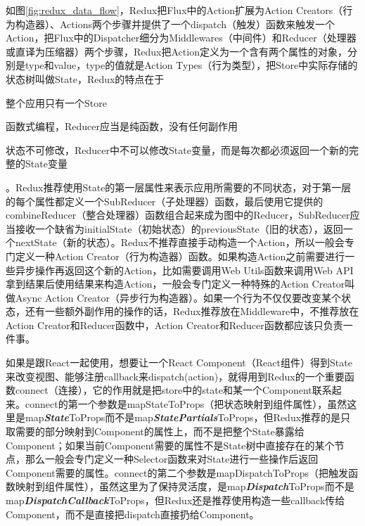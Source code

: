 如图\ref{fig:redux_data_flow}，Redux把Flux中的Action扩展为Action Creators（行为构造器）、Actions两个步骤并提供了一个dispatch（触发）函数来触发一个Action，把Flux中的Dispatcher细分为Middlewares（中间件）和Reducer（处理器或直译为压缩器）两个步骤，Redux把Action定义为一个含有两个属性的对象，分别是type和value，type的值就是Action Types（行为类型），把Store中实际存储的状态树叫做State，Redux的特点在于
\begin{enumerate*}
  \item 整个应用只有一个Store
  \item 函数式编程，Reducer应当是纯函数，没有任何副作用
  \item 状态不可修改，Reducer中不可以修改State变量，而是每次都必须返回一个新的完整的State变量
\end{enumerate*}。Redux推荐使用State的第一层属性来表示应用所需要的不同状态，对于第一层的每个属性都定义一个SubReducer（子处理器）函数，最后使用它提供的combineReducer（整合处理器）函数组合起来成为图中的Reducer，SubReducer应当接收一个缺省为initialState（初始状态）的previousState（旧的状态），返回一个nextState（新的状态）。Redux不推荐直接手动构造一个Action，所以一般会专门定义一种Action Creator（行为构造器）函数。如果构造Action之前需要进行一些异步操作再返回这个新的Action，比如需要调用Web Utils函数来调用Web API拿到结果后使用结果来构造Action，一般会专门定义一种特殊的Action Creator叫做Async Action Creator（异步行为构造器）。如果一个行为不仅仅要改变某个状态，还有一些额外副作用的操作的话，Redux推荐放在Middleware中，不推荐放在Action Creator和Reducer函数中，Action Creator和Reducer函数都应该只负责一件事。

如果是跟React一起使用，想要让一个React Component（React组件）得到State来改变视图、能够注册callback来dispatch(action)，就得用到Redux的一个重要函数connect（连接），它的作用就是把store中的state和某一个Component联系起来。connect的第一个参数是mapStateToProps（把状态映射到组件属性），虽然这里是map\emph{\textbf{State}}ToProps而不是map\emph{\textbf{StatePartials}}ToProps，但Redux推荐的是只取需要的部分映射到Component的属性上，而不是把整个State暴露给Component；如果当前Component需要的属性不是State树中直接存在的某个节点，那么一般会专门定义一种Selector函数来对State进行一些操作后返回Component需要的属性。connect的第二个参数是mapDispatchToProps（把触发函数映射到组件属性），虽然这里为了保持灵活度，是map\emph{\textbf{Dispatch}}ToProps而不是map\emph{\textbf{DispatchCallback}}ToProps，但Redux还是推荐使用构造一些callback传给Component，而不是直接把dispatch直接扔给Component。

